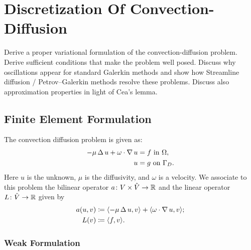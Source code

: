 \chapter[Convection--Diffusion]{Discretization Of Convection-Diffusion}

\begin{problem_text}
   Derive a proper variational formulation of the convection-diffusion problem.
   Derive sufficient conditions that make the problem well posed.  Discuss why
   oscillations appear for standard Galerkin methods and show how Streamline
   diffusion / Petrov--Galerkin methods resolve these problems. Discuss also
   approximation properties in light of Cea’s lemma.
\end{problem_text}

\section{Finite Element Formulation}

The convection diffusion problem is given as:
\begin{align}
    -\mu\operatorname{\mathop{}\!\Delta} u + \omega \cdot \operatorname{\mathop{}\!\nabla} u &= f \text{ in } \Omega, \\
                             u &= g \text{ on } \Gamma_D.
\end{align}
Here \( u \) is the unknown, \( \mu \) is the diffusivity, and \( \omega \) is
a velocity.  We associate to this problem the bilinear operator \( a \colon
V \times \hat{V} \to \mathbb{R} \) and the linear operator \( L \colon \hat{V} \to \mathbb{R}
\) given by
\begin{align}
    a(u, v) &\coloneqq \langle -\mu\operatorname{\mathop{}\!\Delta} u, v \rangle + \langle \omega\cdot
    \operatorname{\mathop{}\!\nabla} u, v \rangle;\\
    L(v) &\coloneqq \langle f, v \rangle.
\end{align}

\subsection{Weak Formulation}

